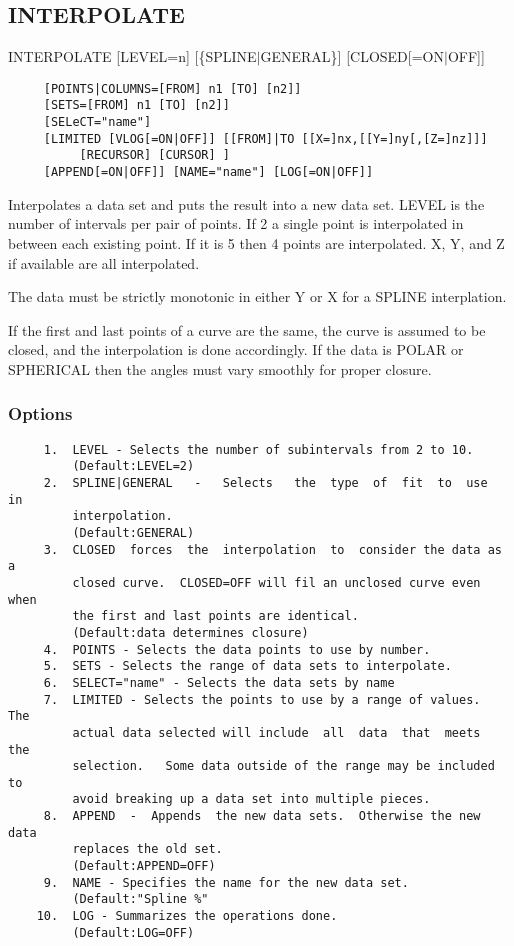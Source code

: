 \subsection{INTERPOLATE}
INTERPOLATE [LEVEL=n] [\{SPLINE$|$GENERAL\}] [CLOSED[=ON$|$OFF]] 
\begin{verbatim}
     [POINTS|COLUMNS=[FROM] n1 [TO] [n2]] 
     [SETS=[FROM] n1 [TO] [n2]] 
     [SELeCT="name"] 
     [LIMITED [VLOG[=ON|OFF]] [[FROM]|TO [[X=]nx,[[Y=]ny[,[Z=]nz]]]
          [RECURSOR] [CURSOR] ] 
     [APPEND[=ON|OFF]] [NAME="name"] [LOG[=ON|OFF]] 
\end{verbatim}
Interpolates  a  data set and puts the result into a new data set.  LEVEL
is the number of intervals per pair of points.  If 2 a  single  point  is
interpolated  in  between  each existing point.  If it is 5 then 4 points
are interpolated.  X, Y, and Z if available are all interpolated.  

The  data  must  be  strictly  monotonic  in  either  Y or X for a SPLINE
interplation.  

If  the  first  and  last  points  of  a curve are the same, the curve is
assumed to be closed, and the interpolation is done accordingly.  If  the
data  is POLAR or SPHERICAL then the angles must vary smoothly for proper
closure.  
\subsubsection{Options}
\begin{verbatim}
     1.  LEVEL - Selects the number of subintervals from 2 to 10.  
         (Default:LEVEL=2) 
     2.  SPLINE|GENERAL   -   Selects   the  type  of  fit  to  use  in
         interpolation.  
         (Default:GENERAL) 
     3.  CLOSED  forces  the  interpolation  to  consider the data as a
         closed curve.  CLOSED=OFF will fil an unclosed curve even when
         the first and last points are identical.  
         (Default:data determines closure) 
     4.  POINTS - Selects the data points to use by number.  
     5.  SETS - Selects the range of data sets to interpolate.  
     6.  SELECT="name" - Selects the data sets by name 
     7.  LIMITED - Selects the points to use by a range of values.  The
         actual data selected will include  all  data  that  meets  the
         selection.   Some data outside of the range may be included to
         avoid breaking up a data set into multiple pieces.  
     8.  APPEND  -  Appends  the new data sets.  Otherwise the new data
         replaces the old set.  
         (Default:APPEND=OFF) 
     9.  NAME - Specifies the name for the new data set.  
         (Default:"Spline %" 
    10.  LOG - Summarizes the operations done.  
         (Default:LOG=OFF) 
\end{verbatim}

